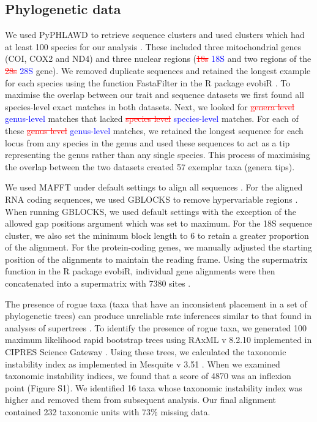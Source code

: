 \documentclass[]{rsos}%
\begin{document}
\subsection{Phylogenetic data}
We used PyPHLAWD to retrieve sequence clusters and used clusters which had at least 100 species for our analysis \cite{smith2018phyphlawd}. 
These included three mitochondrial genes (COI, COX2 and ND4) and three nuclear regions (\textcolor{red}{\st{18s}} \textcolor{blue}{18S} and two regions of the \textcolor{red}{\st{28s}} \textcolor{blue}{28S} gene). 
We removed duplicate sequences and retained the longest example for each species using the function FastaFilter in the R package evobiR \cite{blackmon2015evobir}.
To maximise the overlap between our trait and sequence datasets we first found all species-level exact matches in both datasets.
Next, we looked for \textcolor{red}{\st{genera level}} \textcolor{blue}{genus-level} matches that lacked \textcolor{red}{\st{species level}} \textcolor{blue}{species-level} matches.
For each of these \textcolor{red}{\st{genus level}} \textcolor{blue}{genus-level} matches, we retained the longest sequence for each locus from any species in the genus and used these sequences to act as a tip representing the genus rather than any single species. 
This process of maximising the overlap between the two datasets created 57 exemplar taxa (genera tips).

We used MAFFT under default settings to align all sequences \cite{katoh2013mafft}.
For the aligned RNA coding sequences, we used GBLOCKS to remove hypervariable regions \cite{castresana2000gblocks}. 
When running GBLOCKS, we used default settings with the exception of the allowed gap positions argument which was set to maximum. 
For the 18S sequence cluster, we also set the minimum block length to 6 to retain a greater proportion of the alignment. 
For the protein-coding genes, we manually adjusted the starting position of the alignments to maintain the reading frame. 
Using the supermatrix function in the R package evobiR, individual gene alignments were then concatenated into a supermatrix with 7380 sites \cite{blackmon2015evobir}.

The presence of rogue taxa (taxa that have an inconsistent placement in a set of phylogenetic trees) can produce unreliable rate inferences similar to that found in analyses of supertrees \cite{aberer2012roguetaxa, rabosky2015b}.
To identify the presence of rogue taxa, we generated 100 maximum likelihood rapid bootstrap trees using RAxML v 8.2.10 implemented in CIPRES Science Gateway \cite{stamatakis2014raxml,miller2010cipres}.
Using these trees, we calculated the taxonomic instability index as implemented in Mesquite v 3.51 \cite{maddison2018mesquite}.
When we examined taxonomic instability indices, we found that a score of 4870 was an inflexion point (Figure S1).
We identified 16 taxa whose taxonomic instability index was higher and removed them from subsequent analysis.
Our final alignment contained 232 taxonomic units with 73\% missing data.
\end{document}
